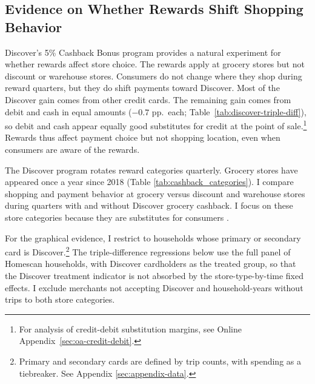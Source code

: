 \documentclass[main.tex]{subfiles}
\begin{document}
\subsection{Evidence on Whether Rewards Shift Shopping Behavior}
\label{subsec:oa-discover-rewards}

Discover's 5\% Cashback Bonus program provides a natural experiment for whether rewards affect store choice.
The rewards apply at grocery stores but not discount or warehouse stores.
Consumers do not change where they shop during reward quarters, but they do shift payments toward Discover.
Most of the Discover gain comes from other credit cards.
The remaining gain comes from debit and cash in equal amounts ($-0.7$ pp.\ each; Table~\ref{tab:discover-triple-diff}), so debit and cash appear equally good substitutes for credit at the point of sale.\footnote{For analysis of credit-debit substitution margins, see Online Appendix~\ref{sec:oa-credit-debit}.}
Rewards thus affect payment choice but not shopping location, even when consumers are aware of the rewards.

The Discover program rotates reward categories quarterly.
Grocery stores have appeared once a year since 2018 (Table \ref{tab:cashback_categories}).
I compare shopping and payment behavior at grocery versus discount and warehouse stores during quarters with and without Discover grocery cashback.
I focus on these store categories because they are substitutes for consumers \parencite{Ellickson.etal2020}.

For the graphical evidence, I restrict to households whose primary or secondary card is Discover.\footnote{Primary and secondary cards are defined by trip counts, with spending as a tiebreaker. See Appendix \ref{sec:appendix-data}.}
The triple-difference regressions below use the full panel of Homescan households, with Discover cardholders as the treated group, so that the Discover treatment indicator is not absorbed by the store-type-by-time fixed effects.
I exclude merchants not accepting Discover and household-years without trips to both store categories.
\end{document}

